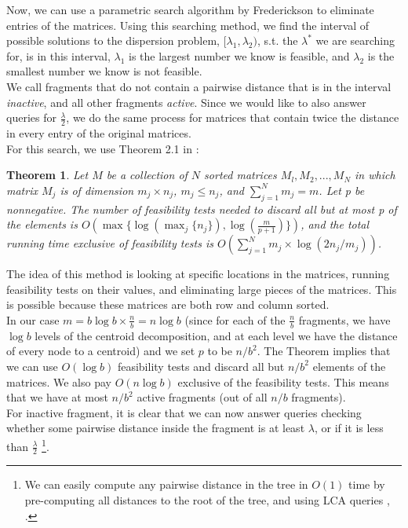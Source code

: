 \documentclass[11pt,a4paper]{article}
\newtheorem{theorem}{Theorem}[section]
\theoremstyle{definition}
\theoremstyle{remark}
\begin{document}
Now, we can use a parametric search algorithm by Frederickson to eliminate entries of the matrices. Using this searching method, we find the interval of possible solutions to the dispersion problem, $[\lambda_1,\lambda_2)$, s.t. the $\lambda^*$ we are searching for, is in this interval, $\lambda_1$ is the largest number we know is feasible, and $\lambda_2$ is the smallest number we know is not feasible.\\
We call fragments that do not contain a pairwise distance that is in the interval \textit{inactive}, and all other fragments \textit{active}.
Since we would like to also answer queries for $\frac{\lambda}{2}$, we do the same process for matrices that contain twice the distance in every entry of the original matrices.\\
For this search, we use Theorem 2.1 in \cite{Frederickson1991}:
\begin{theorem}\label{Frederickson's theorem}
Let $M$ be a collection of $N$ sorted matrices ${M_l, M_2, . . . , M_N}$ in which matrix $M_j$ is of dimension $m_j \times n_j$, $m_j \leq n_j$, and $\sum_{j=1}^{N} m_j = m$.
Let p be nonnegative. The number of feasibility tests needed to discard all but at most p of the elements is $O(\max \lbrace \log(\max_{j} \lbrace n_j \rbrace), \log(\frac{m}{p+1}) \rbrace)$, and the total running time exclusive of feasibility tests is $O(\sum_{j=1}^{N} m_j \times \log (2n_j/m_j))$.
\end{theorem}
The idea of this method is looking at specific locations in the matrices, running feasibility tests on their values, and eliminating large pieces of the matrices. This is possible because these matrices are both row and column sorted.\\
In our case $m=b \log b \times \frac{n}{b} = n \log b$ (since for each of the $\frac{n}{b}$ fragments, we have $\log b$ levels of the centroid decomposition, and at each level we have the distance of every node to a centroid) and we set $p$ to be $n/b^2$. The Theorem implies that we can use $O(\log b)$ feasibility tests and discard all but $n/b^2$ elements of the matrices. We also pay $O(n \log b)$ exclusive of the feasibility tests. This means that we have at most $n/b^2$ active fragments (out of all $n/b$ fragments). \\
For inactive fragment, it is clear that we can now answer queries checking whether some pairwise distance inside the fragment is at least $\lambda$, or if it is less than $\frac{\lambda}{2}$ \footnote{We can easily compute any pairwise distance in the tree in $O(1)$ time by pre-computing all distances to the root of the tree, and using LCA queries \cite{Bender2000}, \cite{Djidjev1991}.}.\\
\end{document}
